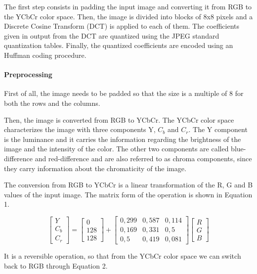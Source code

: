 \documentclass[14pt,a4paper]{extarticle}
\begin{document}
The first step consists in padding the input image and converting it from RGB to the YCbCr color space. Then, the image is divided into blocks of 8x8 pixels and a Discrete Cosine Transform (DCT) is applied to each of them. The coefficients given in output from the DCT are quantized using the JPEG standard quantization tables. Finally, the quantized coefficients are encoded using an Huffman coding procedure.

\paragraph{Preprocessing}
First of all, the image needs to be padded so that the size is a multiple of 8 for both the rows and the columns.


Then, the image is converted from RGB to YCbCr. The YCbCr color space characterizes the image with three components Y, $C_b$ and $C_r$. The Y component is the luminance and it carries the information regarding the brightness of the image and the intensity of the color. The other two components are called blue-difference and red-difference and are also referred to as chroma components, since they carry information about the chromaticity of the image.

The conversion from RGB to YCbCr is a linear transformation of the R, G and B values of the input image. The matrix form of the operation is shown in Equation 1.

\begin{equation}
\begin{bmatrix}
Y\\ 
C_b\\ 
C_r
\end{bmatrix}
= 
\begin{bmatrix}
0\\ 
128\\ 
128
\end{bmatrix}
+
\begin{bmatrix}
0,299 & 0,587 & 0,114\\
0,169 & 0,331 & 0,5\\
0,5 & 0,419 & 0,081
\end{bmatrix}
\begin{bmatrix}
R\\ 
G\\ 
B
\end{bmatrix}
\end{equation}


It is a reversible operation, so that from the YCbCr color space we can switch back to RGB through Equation 2.
\end{document}

